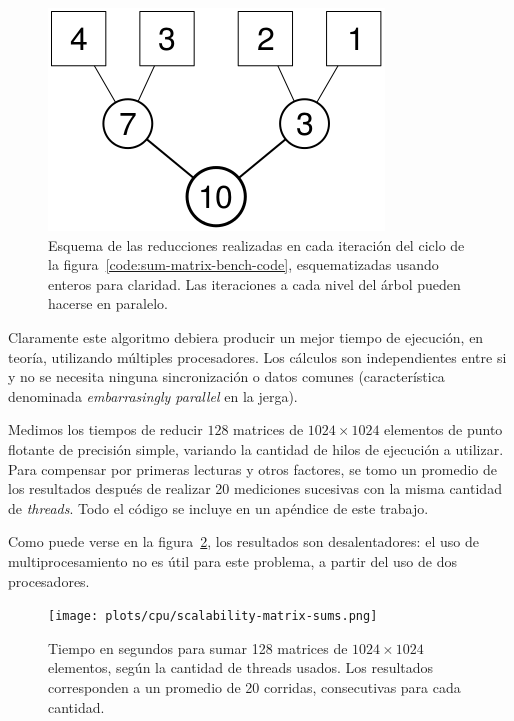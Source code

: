 \begin{figure}[htbp]
   \centering
   \includegraphics[width=\plotwidthtres]{images/reductions.png}
   \caption{Esquema de las reducciones realizadas en cada iteraci\'on del ciclo de la
   figura~\ref{code:sum-matrix-bench-code}, esquematizadas usando enteros para claridad.
   Las iteraciones a cada nivel del \'arbol pueden hacerse en paralelo.}
   \label{fig:sum-matrix-bench-reduce}
\end{figure}

Claramente este algoritmo debiera producir un mejor tiempo de ejecuci\'on, en
teor\'ia, utilizando m\'ultiples procesadores. Los c\'alculos son independientes
entre si y no se necesita ninguna sincronizaci\'on o datos comunes (caracter\'istica
denominada \textit{embarrasingly parallel} en la jerga).

Medimos los tiempos de reducir $128$ matrices de $1024 \times 1024$ elementos de punto
flotante de precisi\'on simple, variando la cantidad de hilos de ejecuci\'on a
utilizar. Para compensar por primeras lecturas y otros factores, se tomo un promedio
de los resultados despu\'es de realizar 20 mediciones sucesivas con la misma
cantidad de \textit{threads}. Todo el c\'odigo se incluye en un ap\'endice de este
trabajo.

Como puede verse en la figura~\ref{fig:sum-matrix-bench-result}, los resultados
son desalentadores: el uso de multiprocesamiento no es \'util para este problema,
a partir del uso de dos procesadores.

\begin{figure}[htbp]
   \centering
   \texttt{[image: plots/cpu/scalability-matrix-sums.png]}
   \caption{Tiempo en segundos para sumar 128 matrices de $1024 \times 1024$
   elementos, seg\'un la cantidad de threads usados. Los resultados corresponden
   a un promedio de 20 corridas, consecutivas para cada cantidad.}
   \label{fig:sum-matrix-bench-result}
\end{figure}

